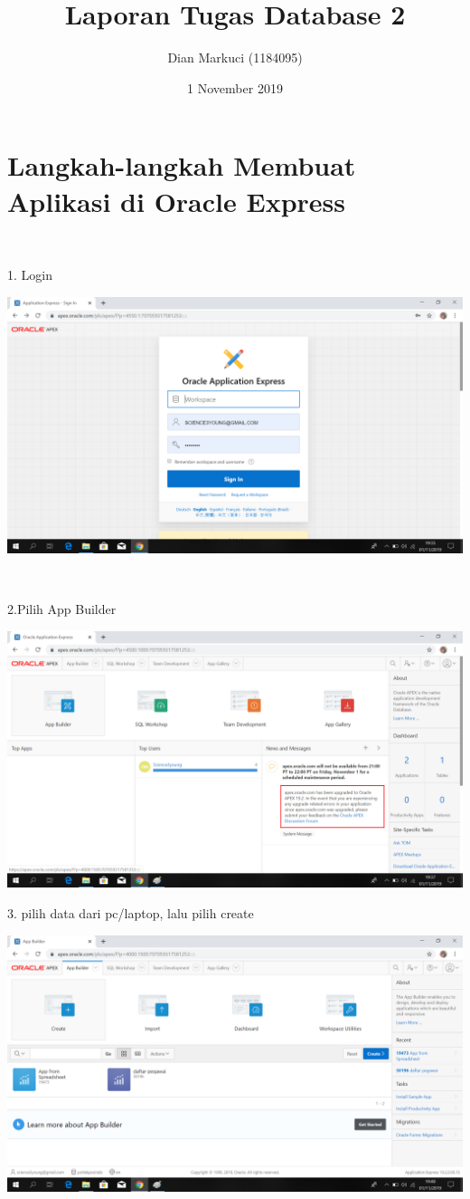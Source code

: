 \documentclass{article}
\title{Laporan Tugas Database 2}
\author{Dian Markuci (1184095)}
\date{1 November 2019}
\begin{document}
\maketitle

\section {\textbf Langkah-langkah Membuat Aplikasi di Oracle Express}\\

\item 1. Login 
\begin{center}
    \includegraphics[width=10cm\textwidth]{figure/1login.png}
\end{center}\\

\item 2.Pilih App Builder
\begin{center}
    \includegraphics[width=10cm\textwidth]{figure/2Appbuilder.png}\\
\end{center}

\item 3. pilih data dari pc/laptop, lalu pilih create
\begin{center}
    \includegraphics[width=10cm\textwidth]{figure/3Create.png}\\
\end{center}
\end{document}
